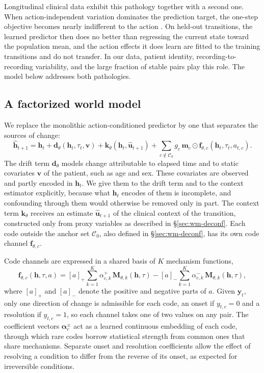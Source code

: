 Longitudinal clinical data exhibit this pathology together with a second one. When action-independent variation dominates the prediction target, the one-step objective becomes nearly indifferent to the action \citep{li2026dueling}. On held-out transitions, the learned predictor then does no better than regressing the current state toward the population mean, and the action effects it does learn are fitted to the training transitions and do not transfer. In our data, patient identity, recording-to-recording variability, and the large fraction of stable pairs play this role. The model below addresses both pathologies.

\subsection{A factorized world model}
\label{sec:wm-model}

We replace the monolithic action-conditioned predictor by one that separates the sources of change:
\begin{equation}
\label{eq:wm-model}
\hat{\mathbf{h}}_{t+1}=\mathbf{h}_t+\mathbf{d}_\theta(\mathbf{h}_t,\tau_t,\mathbf{v})+\mathbf{k}_\theta(\mathbf{h}_t,\hat{\mathbf{u}}_{t+1})+\sum_{c\notin\mathcal{C}_0} g_c\,\mathbf{m}_c\odot\mathbf{f}_{\theta,c}(\mathbf{h}_t,\tau_t,a_{t,c}).
\end{equation}
The drift term $\mathbf{d}_\theta$ models change attributable to elapsed time and to static covariates $\mathbf{v}$ of the patient, such as age and sex. These covariates are observed and partly encoded in $\mathbf{h}_t$. We give them to the drift term and to the context estimator explicitly, because what $\mathbf{h}_t$ encodes of them is incomplete, and confounding through them would otherwise be removed only in part. The context term $\mathbf{k}_\theta$ receives an estimate $\hat{\mathbf{u}}_{t+1}$ of the clinical context of the transition, constructed only from proxy variables as described in \S\ref{sec:wm-deconf}. Each code outside the anchor set $\mathcal{C}_0$, also defined in \S\ref{sec:wm-deconf}, has its own code channel $\mathbf{f}_{\theta,c}$.

Code channels are expressed in a shared basis of $K$ mechanism functions,
\begin{equation}
\label{eq:wm-basis}
\mathbf{f}_{\theta,c}(\mathbf{h},\tau,a)=[a]_{+}\sum_{k=1}^{K}\alpha^{+}_{c,k}\,\mathbf{M}_{\theta,k}(\mathbf{h},\tau)-[a]_{-}\sum_{k=1}^{K}\alpha^{-}_{c,k}\,\mathbf{M}_{\theta,k}(\mathbf{h},\tau),
\end{equation}
where $[a]_{+}$ and $[a]_{-}$ denote the positive and negative parts of $a$. Given $\mathbf{y}_t$, only one direction of change is admissible for each code, an onset if $y_{t,c}=0$ and a resolution if $y_{t,c}=1$, so each channel takes one of two values on any pair. The coefficient vectors $\boldsymbol{\alpha}^{\pm}_c$ act as a learned continuous embedding of each code, through which rare codes borrow statistical strength from common ones that share mechanisms. Separate onset and resolution coefficients allow the effect of resolving a condition to differ from the reverse of its onset, as expected for irreversible conditions.

